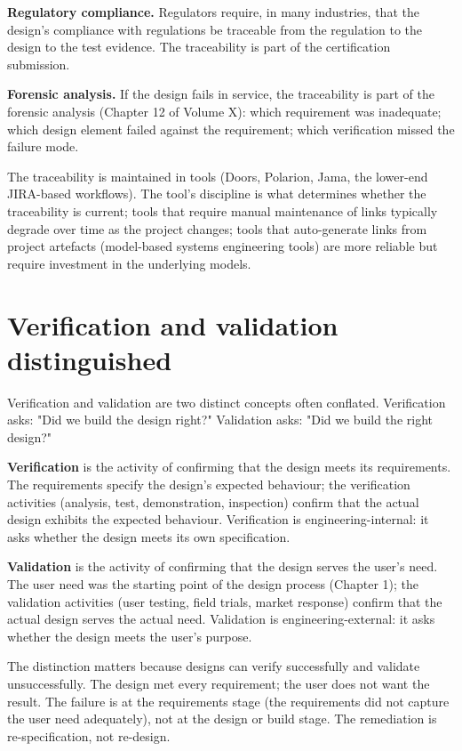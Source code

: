 \textbf{Regulatory compliance.} Regulators require, in many industries, that the design's compliance with regulations be traceable from the regulation to the design to the test evidence. The traceability is part of the certification submission.

\textbf{Forensic analysis.} If the design fails in service, the traceability is part of the forensic analysis (Chapter 12 of Volume X): which requirement was inadequate; which design element failed against the requirement; which verification missed the failure mode.

The traceability is maintained in tools (Doors, Polarion, Jama, the lower-end JIRA-based workflows). The tool's discipline is what determines whether the traceability is current; tools that require manual maintenance of links typically degrade over time as the project changes; tools that auto-generate links from project artefacts (model-based systems engineering tools) are more reliable but require investment in the underlying models.

\section{Verification and validation distinguished}

Verification and validation are two distinct concepts often conflated. Verification asks: "Did we build the design right?" Validation asks: "Did we build the right design?"

\textbf{Verification} is the activity of confirming that the design meets its requirements. The requirements specify the design's expected behaviour; the verification activities (analysis, test, demonstration, inspection) confirm that the actual design exhibits the expected behaviour. Verification is engineering-internal: it asks whether the design meets its own specification.

\textbf{Validation} is the activity of confirming that the design serves the user's need. The user need was the starting point of the design process (Chapter 1); the validation activities (user testing, field trials, market response) confirm that the actual design serves the actual need. Validation is engineering-external: it asks whether the design meets the user's purpose.

The distinction matters because designs can verify successfully and validate unsuccessfully. The design met every requirement; the user does not want the result. The failure is at the requirements stage (the requirements did not capture the user need adequately), not at the design or build stage. The remediation is re-specification, not re-design.

